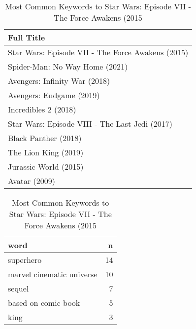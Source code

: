 \begin{table}[H]
\parbox{.45\linewidth}{
\centering
\begin{tabular}{l}
  \hline
Full Title \\ 
  \hline
Star Wars: Episode VII - The Force Awakens (2015) \\ 
  Spider-Man: No Way Home (2021) \\ 
  Avengers: Infinity War (2018) \\ 
  Avengers: Endgame (2019) \\ 
  Incredibles 2 (2018) \\ 
  Star Wars: Episode VIII - The Last Jedi (2017) \\ 
  Black Panther (2018) \\ 
  The Lion King (2019) \\ 
  Jurassic World (2015) \\ 
  Avatar (2009) \\ 
   \hline
\end{tabular}
\caption{The Nearest Movies to Star Wars: Episode VII - The Force Awakens (2015)} 
}
\hfill
\parbox{.45\linewidth}{
\centering
\begin{tabular}{lr}
  \hline
word & n \\ 
  \hline
superhero &  14 \\ 
  marvel cinematic universe &  10 \\ 
  sequel &   7 \\ 
  based on comic book &   5 \\ 
  king &   3 \\ 
   \hline
\end{tabular}
\caption{Most Common Keywords to Star Wars: Episode VII - The Force Awakens (2015} 
}
\end{table}


